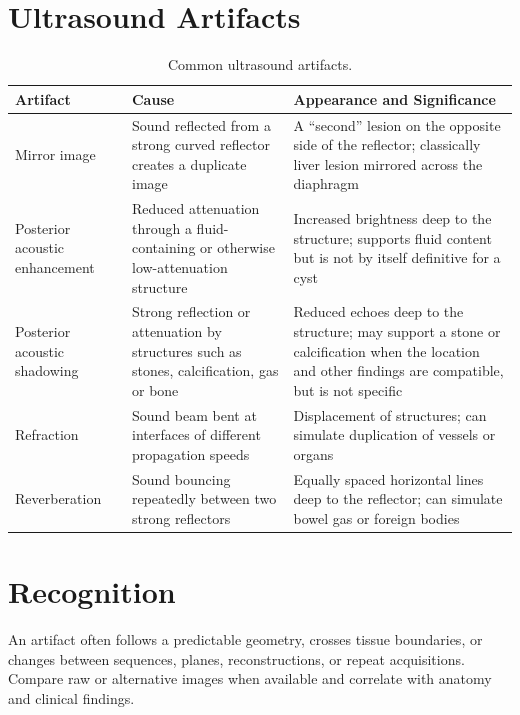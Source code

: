 \section{Ultrasound Artifacts}

\begin{table}[h]
\centering
\caption{Common ultrasound artifacts.}
\label{tab:us_artifacts}
\begin{tabular}{p{3cm} p{4cm} p{7cm}}
\toprule
\textbf{Artifact} & \textbf{Cause} & \textbf{Appearance and Significance} \\
\midrule
Mirror image & Sound reflected from a strong curved reflector creates a duplicate image & A ``second'' lesion on the opposite side of the reflector; classically liver lesion mirrored across the diaphragm \\
Posterior acoustic enhancement & Reduced attenuation through a fluid-containing or otherwise low-attenuation structure & Increased brightness deep to the structure; supports fluid content but is not by itself definitive for a cyst \\
Posterior acoustic shadowing & Strong reflection or attenuation by structures such as stones, calcification, gas or bone & Reduced echoes deep to the structure; may support a stone or calcification when the location and other findings are compatible, but is not specific \\
Refraction & Sound beam bent at interfaces of different propagation speeds & Displacement of structures; can simulate duplication of vessels or organs \\
Reverberation & Sound bouncing repeatedly between two strong reflectors & Equally spaced horizontal lines deep to the reflector; can simulate bowel gas or foreign bodies \\
\bottomrule
\end{tabular}
\end{table}

\section{Recognition}
An artifact often follows a predictable geometry, crosses tissue boundaries, or changes between sequences, planes, reconstructions, or repeat acquisitions. Compare raw or alternative images when available and correlate with anatomy and clinical findings.

